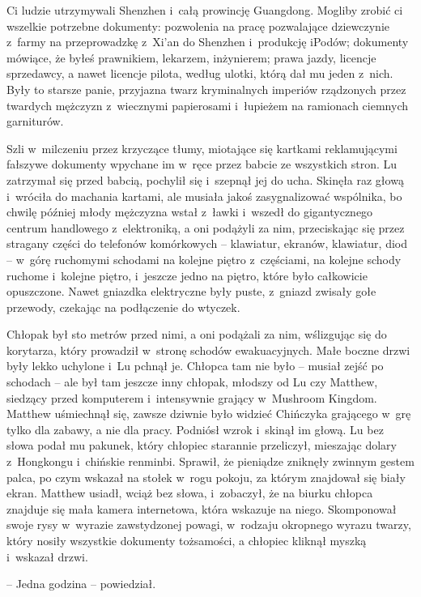 \documentclass[oneside,polish,11pt,rmheadings]{mwbk}
\begin{document}
Ci ludzie utrzymywali Shenzhen i~całą prowincję Guangdong. Mogliby zrobić ci wszelkie potrzebne dokumenty: pozwolenia na pracę pozwalające dziewczynie z~farmy na przeprowadzkę z~Xi'an do Shenzhen i~produkcję iPodów; dokumenty mówiące, że byłeś prawnikiem, lekarzem, inżynierem; prawa jazdy, licencje sprzedawcy, a nawet licencje pilota, według ulotki, którą dał mu jeden z~nich. Były to starsze panie, przyjazna twarz kryminalnych imperiów rządzonych przez twardych mężczyzn z~wiecznymi papierosami i~łupieżem na ramionach ciemnych garniturów.

Szli w~milczeniu przez krzyczące tłumy, miotające się kartkami reklamującymi fałszywe dokumenty wpychane im w~ręce przez babcie ze wszystkich stron. Lu zatrzymał się przed babcią, pochylił się i~szepnął jej do ucha. Skinęła raz głową i~wróciła do machania kartami, ale musiała jakoś zasygnalizować wspólnika, bo chwilę później młody mężczyzna wstał z~ławki i~wszedł do gigantycznego centrum handlowego z~elektroniką, a oni podążyli za nim, przeciskając się przez stragany części do telefonów komórkowych -- klawiatur, ekranów, klawiatur, diod -- w~górę ruchomymi schodami na kolejne piętro z~częściami, na kolejne schody ruchome i~kolejne piętro, i~jeszcze jedno na piętro, które było całkowicie opuszczone. Nawet gniazdka elektryczne były puste, z~gniazd zwisały gołe przewody, czekając na podłączenie do wtyczek.

Chłopak był sto metrów przed nimi, a oni podążali za nim, wślizgując się do korytarza, który prowadził w~stronę schodów ewakuacyjnych. Małe boczne drzwi były lekko uchylone i~Lu pchnął je. Chłopca tam nie było -- musiał zejść po schodach -- ale był tam jeszcze inny chłopak, młodszy od Lu czy Matthew, siedzący przed komputerem i~intensywnie grający w~Mushroom Kingdom. Matthew uśmiechnął się, zawsze dziwnie było widzieć Chińczyka grającego w~grę tylko dla zabawy, a nie dla pracy. Podniósł wzrok i~skinął im głową. Lu bez słowa podał mu pakunek, który chłopiec starannie przeliczył, mieszając dolary z~Hongkongu i~chińskie renminbi. Sprawił, że pieniądze zniknęły zwinnym gestem palca, po czym wskazał na stołek w~rogu pokoju, za którym znajdował się biały ekran. Matthew usiadł, wciąż bez słowa, i~zobaczył, że na biurku chłopca znajduje się mała kamera internetowa, która wskazuje na niego. Skomponował swoje rysy w~wyrazie zawstydzonej powagi, w~rodzaju okropnego wyrazu twarzy, który nosiły wszystkie dokumenty tożsamości, a chłopiec kliknął myszką i~wskazał drzwi. 

-- Jedna godzina -- powiedział.
\end{document}
